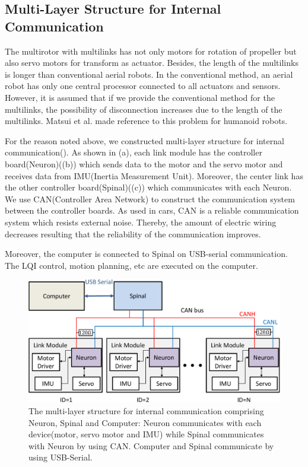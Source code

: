 \subsection{Multi-Layer Structure for Internal Communication}
The multirotor with multilinks has not only motors for rotation of propeller but also servo motors for transform as actuator. Besides, the length of the multilinks is longer than conventional aerial robots. In the conventional method, an aerial robot has only one central processor connected to all actuators and sensors. However, it is assumed that if we provide the conventional method for the multilinks, the possibility of disconnection increases due to the length of the multilinks. Matsui et al.\cite{Matsui2005} made reference to this problem for humanoid robots.
\par
For the reason noted above, we constructed multi-layer structure for internal communication(). As shown in (a), each link module has the controller board(Neuron)((b)) which sends data to the motor and the servo motor and receives data from IMU(Inertia Measurement Unit). Moreover, the center link has the other controller board(Spinal)((c)) which communicates with each Neuron. We use CAN(Controller Area Network)\cite{CAN} to construct the communication system between the controller boards. As used in cars, CAN is a reliable communication system which resists external noise. Thereby, the amount of electric wiring decreases resulting that the reliability of the communication improves. 
\par
Moreover, the computer is connected to Spinal on USB-serial communication. The LQI control, motion planning, etc are executed on the computer.

\begin{figure}[t]
  \begin{center}
    \includegraphics[width=1.0\columnwidth]{figs/internal_communication.pdf}
  \end{center}
  \caption{The multi-layer structure for internal communication comprising Neuron, Spinal and Computer: Neuron communicates with each device(motor, servo motor and IMU) while Spinal communicates with Neuron by using CAN. Computer and Spinal communicate by using USB-Serial.\label{figure:internal_communication}}
\end{figure}
